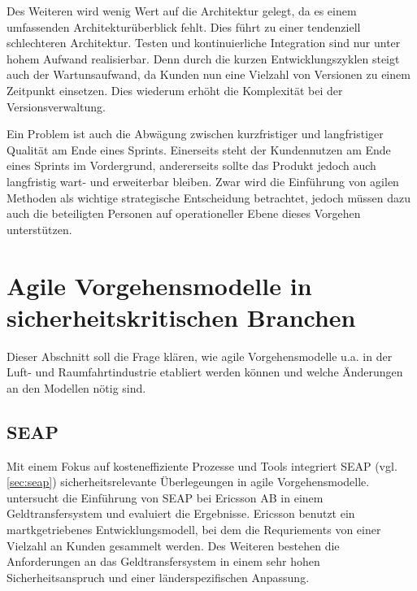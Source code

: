 Des Weiteren wird wenig Wert auf die Architektur gelegt, da es einem umfassenden Architekturüberblick fehlt. 
Dies führt zu einer tendenziell schlechteren Architektur.
Testen und kontinuierliche Integration sind nur unter hohem Aufwand realisierbar.
Denn durch die kurzen Entwicklungszyklen steigt auch der Wartunsaufwand, da Kunden nun eine Vielzahl von Versionen zu einem Zeitpunkt einsetzen.
Dies wiederum erhöht die Komplexität bei der Versionsverwaltung.
\parencite[Vgl.][S. 1486]{Petersen20091479}

Ein Problem ist auch die Abwägung zwischen kurzfristiger und langfristiger Qualität am Ende eines Sprints.
Einerseits steht der Kundennutzen am Ende eines Sprints im Vordergrund, andererseits sollte das Produkt jedoch auch langfristig wart- und erweiterbar bleiben.
Zwar wird die Einführung von agilen Methoden als wichtige strategische Entscheidung betrachtet, jedoch müssen dazu auch die beteiligten Personen auf operationeller Ebene dieses Vorgehen unterstützen.
\parencite[Vgl.][S. 863 f.]{Moe:2012aa}



\newpage
\section{Agile Vorgehensmodelle in sicherheitskritischen Branchen} %

Dieser Abschnitt soll die Frage klären, wie agile Vorgehensmodelle u.a. in der Luft- und Raumfahrtindustrie etabliert werden können und welche Änderungen an den Modellen nötig sind.

\subsection{SEAP} 

Mit einem Fokus auf kosteneffiziente Prozesse und Tools integriert SEAP (vgl. \autoref{sec:seap}) sicherheitsrelevante Überlegeungen in agile Vorgehensmodelle.
\parencite[][]{Baca:2015aa} untersucht die Einführung von SEAP bei Ericsson AB in einem Geldtransfersystem und evaluiert die Ergebnisse.
Ericsson benutzt ein martkgetriebenes Entwicklungsmodell, bei dem die Requriements von einer Vielzahl an Kunden gesammelt werden.
Des Weiteren bestehen die Anforderungen an das Geldtransfersystem in einem sehr hohen Sicherheitsanspruch und einer länderspezifischen Anpassung.

